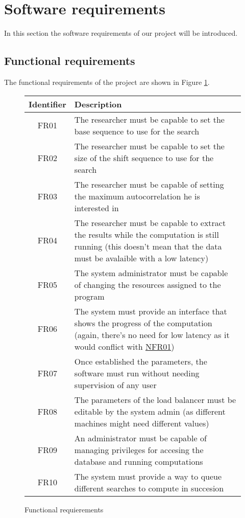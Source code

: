 \section{Software requirements}

In this section the software requirements of our project will be introduced.

\subsection{Functional requirements}

The functional requirements of the project are shown in Figure
\ref{functional:fig}.


\begin{figure}[ht!]

  \begin{center}
    \begin{tabular}{||c | p{12cm}||}
      \hline
      Identifier & Description \\
      \hline
      \hline
      FR01 \label{FR01} & The researcher must be capable to set the base
      sequence to use for the search \\
      \hline
      FR02 \label{FR02} & The researcher must be capable to set the size
      of the shift sequence to use for the search\\
      \hline
      FR03 \label{FR03} & The researcher must be capable of setting the maximum
      autocorrelation he is interested in \\
      \hline
      FR04 \label{FR04} & The researcher must be capable to extract the
      results while the computation is still running (this doesn't mean that
      the data must be avalaible with a low latency)\\
      \hline
      FR05 \label{FR05} & The system administrator must be capable of changing
      the resources assigned to the program\\
      \hline
      FR06 \label{FR06} & The system must provide an interface that shows
      the progress of the computation (again, there's no need for low latency
      as it would conflict with \hyperref[NFR01]{NFR01})\\
      \hline
      FR07 \label{FR07} & Once established the parameters, the software must
      run without needing supervision of any user \\
      \hline
      FR08 \label{FR08} & The parameters of the load balancer must be editable
      by the system admin (as different machines might need different values)
      \\
      \hline
      FR09 \label{FR09} & An administrator must be capable of managing
      privileges for accesing the database and running computations\\
      \hline
      FR10 \label{FR10} & The system must provide a way to queue different
      searches to compute in succesion\\
      \hline
    \end{tabular}
  \end{center}

  \caption{Functional requierements}
  \label{functional:fig}
\end{figure}

